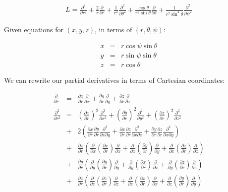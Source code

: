 \documentclass[a4paper,12pt]{article}
\begin{document}
\begin{eqnarray}
L = \frac{\partial^2}{\partial r^2} + \frac{2}{r}\frac{\partial}{\partial r} + \frac{1}{r^2}\frac{\partial^2}{\partial \theta^2} + \frac{\cos\theta}{r^2\sin\theta}\frac{\partial}{\partial \theta} + \frac{1}{r^2 \sin^2\theta}\frac{\partial^2}{\partial\psi^2}\nonumber
\end{eqnarray}

Given equations for $(x,y,z)$, in terms of $(r,\theta,\psi)$:

\begin{eqnarray}
x &=& r\cos\psi\sin\theta \nonumber\\
y &=& r\sin\psi\sin\theta \nonumber\\
z &=& r\cos\theta\nonumber
\end{eqnarray}

We can rewrite our partial derivatives in terms of Cartesian coordinates:

\begin{eqnarray}
\frac{\partial}{\partial r} &=& \frac{\partial x}{\partial r}\frac{\partial}{\partial x} + \frac{\partial y}{\partial r}\frac{\partial}{\partial y} + \frac{\partial z}{\partial r}\frac{\partial}{\partial z}\nonumber\\
\frac{\partial^2}{\partial r^2} &=& \left(\frac{\partial x}{\partial r}\right)^2\frac{\partial^2}{\partial x^2} + \left(\frac{\partial y}{\partial r}\right)^2\frac{\partial^2}{\partial y^2} + \left(\frac{\partial z}{\partial r}\right)^2\frac{\partial^2}{\partial z^2} \nonumber\\
&+& 2\left(\frac{\partial x}{\partial r}\frac{\partial y}{\partial r}\frac{\partial^2}{\partial x \partial y} + \frac{\partial x}{\partial r}\frac{\partial z}{\partial r}\frac{\partial^2}{\partial x \partial z} + \frac{\partial y}{\partial r}\frac{\partial z}{\partial r}\frac{\partial^2}{\partial x \partial y}\right)\nonumber\\ 
&+& \frac{\partial x}{\partial r}\left(\frac{\partial}{\partial x}\left(\frac{\partial x}{\partial r}\right)\frac{\partial}{\partial x} + \frac{\partial}{\partial x}\left(\frac{\partial y}{\partial r}\right)\frac{\partial}{\partial y} + \frac{\partial}{\partial x}\left(\frac{\partial z}{\partial r}\right)\frac{\partial}{\partial z}\right)\nonumber\\ 
&+& \frac{\partial y}{\partial r}\left(\frac{\partial}{\partial y}\left(\frac{\partial y}{\partial r}\right)\frac{\partial}{\partial y} + \frac{\partial}{\partial y}\left(\frac{\partial x}{\partial r}\right)\frac{\partial}{\partial x} + \frac{\partial}{\partial y}\left(\frac{\partial z}{\partial r}\right)\frac{\partial}{\partial z}\right)\nonumber\\
&+& \frac{\partial z}{\partial r}\left(\frac{\partial}{\partial z}\left(\frac{\partial z}{\partial r}\right)\frac{\partial}{\partial z} + \frac{\partial}{\partial z}\left(\frac{\partial x}{\partial r}\right)\frac{\partial}{\partial x} + \frac{\partial}{\partial z}\left(\frac{\partial y}{\partial r}\right)\frac{\partial}{\partial y}\right)\nonumber
\end{eqnarray}
\end{document}
